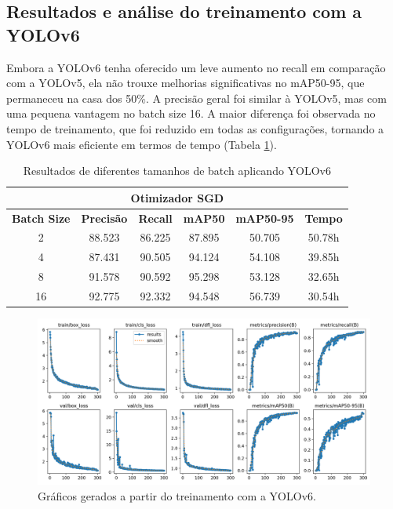 \subsection{Resultados e análise do treinamento com a YOLOv6}

Embora a YOLOv6 tenha oferecido um leve aumento no recall em comparação com a YOLOv5, ela não trouxe melhorias significativas no mAP50-95, que permaneceu na casa dos 50\%. A precisão geral foi similar à YOLOv5, mas com uma pequena vantagem no batch size 16. A maior diferença foi observada no tempo de treinamento, que foi reduzido em todas as configurações, tornando a YOLOv6 mais eficiente em termos de tempo (Tabela \ref{tab:yolov6-teste}).

\begin{table}[!hbt]
    \centering
    \begin{tabular}{|c|c|c|c|c|c|}
    \hline
    \multicolumn{6}{|c|}{\textbf{Otimizador SGD}} \\ \hline
    \textbf{Batch Size} & \textbf{Precisão} & \textbf{Recall} & \textbf{mAP50} & \textbf{mAP50-95} & \textbf{Tempo} \\ \hline
    2                   & 88.523                & 86.225               & 87.895              & 50.705                 & 50.78h             \\ \hline
    4                   & 87.431                 & 90.505               & 94.124             & 54.108                & 39.85h             \\ \hline
    8                   & 91.578                 & 90.592               & 95.298              & 53.128                 & 32.65h             \\ \hline
    16                  & 92.775                & 92.332               & 94.548             & 56.739                 & 30.54h             \\ \hline
    \end{tabular}
    \caption{Resultados de diferentes tamanhos de batch aplicando YOLOv6}
    \label{tab:yolov6-teste}
\end{table}


\begin{figure}[!h]
    \centering
    \begin{minipage}{1\linewidth}
    \centering
    \captionsetup{justification=centering,margin=0.5cm,font=small}
    \includegraphics[width=1\linewidth]{img/cap6/results-yolov6-batch-16.png}
    \caption{Gráficos gerados a partir do treinamento com a YOLOv6.}
    \label{fig:yolov6batch16}
    \end{minipage}
\end{figure}


